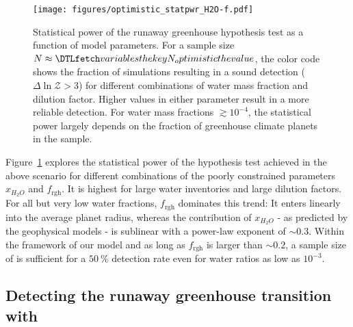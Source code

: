 \documentclass[twocolumn,twocolappendix]{aastex631}
\begin{document}
\begin{figure}[ht!]
    \begin{centering}
        \texttt{[image: figures/optimistic\_statpwr\_H2O-f.pdf]}
        \caption{
            Statistical power of the runaway greenhouse hypothesis test as a function of model parameters.
            For a sample size $N \approx \var{N_optimistic}$, the color code shows the fraction of simulations resulting in a sound detection ($\Delta \ln \mathcal{Z} > 3$) for different combinations of water mass fraction and dilution factor.
            Higher values in either parameter result in a more reliable detection.
            For water mass fractions $\gtrsim 10^{-4}$, the statistical power largely depends on the fraction of greenhouse climate planets in the sample.
        }
        \label{fig:statpwr_H2O-f}
    \end{centering}
\end{figure}
Figure~\ref{fig:statpwr_H2O-f} explores the statistical power of the hypothesis test achieved in the above scenario for different combinations of the poorly constrained parameters $x_{H_2O}$ and $f_\mathrm{rgh}$.
It is highest for large water inventories and large dilution factors.
 For all but very low water fractions, $f_\mathrm{rgh}$ dominates this trend: It enters linearly into the average planet radius, whereas the contribution of $x_{H_2O}$ - as predicted by the geophysical models - is sublinear with a power-law exponent of $\sim 0.3$.
Within the framework of our model and as long as $f_\mathrm{rgh}$ is larger than $\sim 0.2$, a sample size of  is sufficient for a $\SI{50}{\percent}$ detection rate even for water ratios as low as $10^{-3}$.



\subsection{Detecting the runaway greenhouse transition with \plato}\label{sec:res_samplesize}
\end{document}
